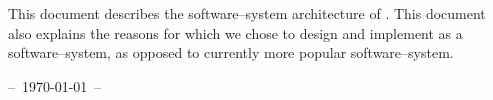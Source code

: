 \begin{center}
\parbox{42em}{
This document describes the \thickclient
software--system architecture of \yerotherpblack.
This document also explains the reasons for
which we chose to design and implement
\yerotherpblack as a \thickclient software--system,
as opposed to currently more popular
\webbrowserbased software--system.
}

\vspace{0.6em}

{\centering --~\today~--}
\end{center}